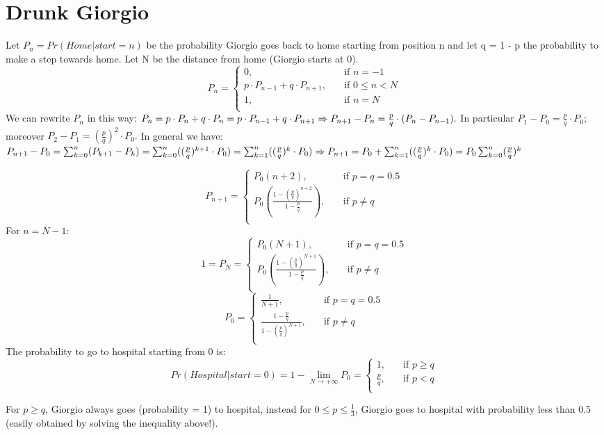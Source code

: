 \section{Drunk Giorgio}
Let $P_n = Pr(Home | start = n)$ be the probability Giorgio goes back to home starting from position n and let q = 1 - p the probability to make a step towards home. Let N be the distance from home (Giorgio starts at 0).
\[   
P_n = 
\begin{cases}
0, &\quad\text{if } n = -1\\
p \cdot P_{n-1} + q \cdot P_{n+1}, &\quad\text{if } 0 \leq n < N\\
1, &\quad\text{if } n = N\\
\end{cases}
\]
We can rewrite $P_n$ in this way:
$
P_n = p \cdot P_n + q \cdot P_n = p \cdot P_{n-1} + q \cdot P_{n+1}
\newline \Rightarrow P_{n+1} - P_n = \frac{p}{q} \cdot (P_n - P_{n-1}).
\newline$
In particular $P_1 - P_0 = \frac{p}{q} \cdot P_0;$ moreover $P_2 - P_1 = (\frac{p}{q})^2 \cdot P_0.$
In general we have: $P_{n+1} - P_0 = \sum_{k=0}^{n} (P_{k+1} - P_k) = \sum_{k=0}^{n} ((\frac{p}{q})^{k+1} \cdot P_0) = \sum_{k=1}^{n} ((\frac{p}{q})^{k} \cdot P_0)
\newline \Rightarrow P_{n+1} = P_0 + \sum_{k=1}^{n} ((\frac{p}{q})^{k} \cdot P_0) = P_0\sum_{k=0}^{n} (\frac{p}{q})^{k}$

\[   
P_{n+1} = 
\begin{cases}
P_0 (n+2), &\quad\text{if } p = q = 0.5\\
P_0 (\frac{1-(\frac{p}{q})^{n+2}}{1-\frac{p}{q}}), &\quad\text{if } p \neq q\\
\end{cases}
\]
For $n = N -1$:
\[   
1 = P_N = 
\begin{cases}
P_0 (N+1), &\quad\text{if } p = q = 0.5\\
P_0 (\frac{1-(\frac{p}{q})^{N+1}}{1-\frac{p}{q}}), &\quad\text{if } p \neq q\\
\end{cases}
\]
\[   
P_0 = 
\begin{cases}
\frac{1}{N+1}, &\quad\text{if } p = q = 0.5\\
\frac{1-\frac{p}{q}}{1-(\frac{p}{q})^{N+1}}, &\quad\text{if } p \neq q\\
\end{cases}
\]
The probability to go to hospital starting from 0 is:
\[   
Pr(Hospital | start = 0) = 1 - \lim_{N \to +\infty} P_0 =
\begin{cases}
1, &\quad\text{if } p \geq q\\
\frac{p}{q}, &\quad\text{if } p < q\\
\end{cases}
\]
 
For $p \geq q$, Giorgio always goes (probability = 1) to hospital, instead for $0 \leq p \leq \frac{1}{3}$, Giorgio goes to hospital with probability less than 0.5 (easily obtained by solving the inequality above!).
 
 
 
 
 
 
 
 
 